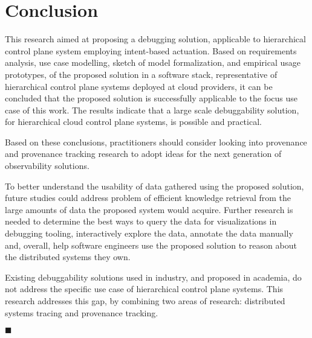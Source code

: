 \section{Conclusion}

This research aimed at proposing a debugging solution, applicable to hierarchical control plane system employing intent-based actuation. Based on requirements analysis, use case modelling, sketch of model formalization, and empirical usage prototypes, of the proposed solution in a software stack, representative of hierarchical control plane systems deployed at cloud providers, it can be concluded that the proposed solution is successfully applicable to the focus use case of this work. The results indicate that a large scale debuggability solution, for hierarchical cloud control plane systems, is possible and practical.

Based on these conclusions, practitioners should consider looking into provenance and provenance tracking research to adopt ideas for the next generation of observability solutions.

To better understand the usability of data gathered using the proposed solution, future studies could address problem of efficient knowledge retrieval from the large amounts of data the proposed system would acquire. Further research is needed to determine the best ways to query the data for visualizations in debugging tooling, interactively explore the data, annotate the data manually and, overall, help software engineers use the proposed solution to reason about the distributed systems they own.

Existing debuggability solutions used in industry, and proposed in academia, do not address the specific use case of hierarchical control plane systems. This research addresses this gap, by combining two areas of research: distributed systems tracing and provenance tracking.

\hfill$\blacksquare$